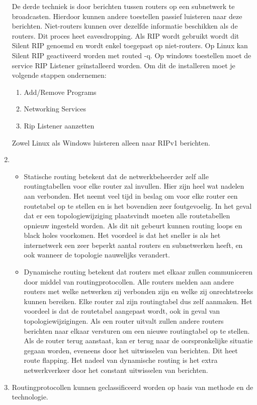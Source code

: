\documentclass{report}
\begin{document}
\begin{enumerate}
	De derde techniek is door berichten tussen routers op een subnetwerk te broadcasten. Hierdoor kunnen andere toestellen passief luisteren naar deze berichten. Niet-routers kunnen over dezelfde informatie beschikken als de routers. Dit proces heet eavesdropping. Als RIP wordt gebruikt wordt dit Silent RIP genoemd en wordt enkel toegepast op niet-routers. Op Linux kan Silent RIP geactiveerd worden met routed -q. Op windows toestellen moet de service RIP Listener geïnstalleerd worden. Om dit de installeren moet je volgende stappen ondernemen:
	\begin{enumerate}
		\item Add/Remove Programs
		\item Networking Services
		\item Rip Listener aanzetten
	\end{enumerate}
	Zowel Linux als Windows luisteren alleen naar RIPv1 berichten.
	\item 
	\begin{itemize}
			\item Statische routing betekent dat de netwerkbeheerder zelf alle routingtabellen voor elke router zal invullen. Hier zijn heel wat nadelen aan verbonden. Het neemt veel tijd in beslag om voor elke router een routetabel op te stellen en is het bovendien zeer foutgevoelig. In het geval dat er een topologiewijziging plaatsvindt moeten alle routetabellen opnieuw ingesteld worden. Als dit nit gebeurt kunnen routing loops en black holes voorkomen. Het voordeel is dat het sneller is als het internetwerk een zeer beperkt aantal routers en subnetwerken heeft, en ook wanneer de topologie nauwelijks verandert.
			\item Dynamische routing betekent dat routers met elkaar zullen communiceren door middel van routingprotocollen. Alle routers melden aan andere routers met welke netwerken zij verbonden zijn en welke zij onrechtstreeks kunnen bereiken. Elke router zal zijn routingtabel dus zelf aanmaken. Het voordeel is dat de routetabel aangepast wordt, ook in geval van topologiewijzigingen. Als een router uitvalt zullen andere routers berichten naar elkaar versturen om een nieuwe routingtabel op te stellen. Als de router terug aanstaat, kan er terug naar de oorspronkelijke situatie gegaan worden, eveneens door het uitwisselen van berichten. Dit heet route flapping. Het nadeel van dynamische routing is het extra netwerkverkeer door het constant uitwisselen van berichten.
		\end{itemize}
		\item Routingprotocollen kunnen geclassificeerd worden op basis van methode en de technologie.

\end{enumerate}
\end{document}
